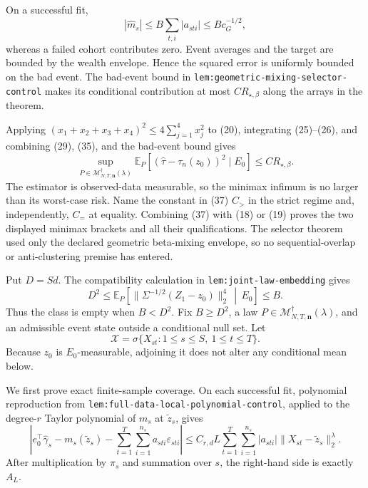 On a successful fit,
\[
|\widehat m_s|\leq B\sum_{t,i}|a_{sti}|\leq Bc_G^{-1/2},
\tag{36}
\]
whereas a failed cohort contributes zero.  Event averages and the target are bounded by the wealth envelope.  Hence the squared error is uniformly bounded on the bad event.  The bad-event bound in \texttt{lem:geometric-mixing-selector-control} makes its conditional contribution at most \(CR_{\star,\beta}\) along the arrays in the theorem.

Applying \((x_1+x_2+x_3+x_4)^2\leq4\sum_{j=1}^4x_j^2\) to (20), integrating (25)--(26), and combining (29), (35), and the bad-event bound gives
\[
\sup_{P\in\mathcal M_{N,T,\mathbf n}^{\dagger}(\lambda)}
\mathbb E_P[(\widehat\tau-\tau_n(z_0))^2\mid E_0]
\leq CR_{\star,\beta}.
\tag{37}
\]
The estimator is observed-data measurable, so the minimax infimum is no larger than its worst-case risk.  Name the constant in (37) \(C_{>}\) in the strict regime and, independently, \(C_{=}\) at equality.  Combining (37) with (18) or (19) proves the two displayed minimax brackets and all their qualifications.  The selector theorem used only the declared geometric beta-mixing envelope, so no sequential-overlap or anti-clustering premise has entered.

Put \(D=Sd\).  The compatibility calculation in \texttt{lem:joint-law-embedding} gives
\[
D^2\leq
\mathbb E_P\!\left[
\|\Sigma^{-1/2}(Z_1-z_0)\|_2^4
\,\middle|\,E_0\right]
\leq B.
\tag{38}
\]
Thus the class is empty when \(B<D^2\).  Fix \(B\geq D^2\), a law
\(P\in\mathcal M_{N,T,\mathbf n}^{\dagger}(\lambda)\), and an admissible event state outside a conditional null set.  Let
\[
\mathscr X=\sigma\{X_{st}:1\leq s\leq S,\ 1\leq t\leq T\}.
\]
Because \(z_0\) is \(E_0\)-measurable, adjoining it does not alter any conditional mean below.

We first prove exact finite-sample coverage.  On each successful fit, polynomial reproduction from \texttt{lem:full-data-local-polynomial-control}, applied to the degree-\(r\) Taylor polynomial of \(m_s\) at \(\widetilde z_s\), gives
\[
\left|
e_0^\top\widehat\gamma_s-m_s(\widetilde z_s)
-\sum_{t=1}^{T}\sum_{i=1}^{n_s}a_{sti}\varepsilon_{sti}
\right|
\leq C_{r,d}L\sum_{t=1}^{T}\sum_{i=1}^{n_s}|a_{sti}|
\|X_{st}-\widetilde z_s\|_2^\lambda.
\tag{39}
\]
After multiplication by \(\pi_s\) and summation over \(s\), the right-hand side is exactly \(A_L\).

